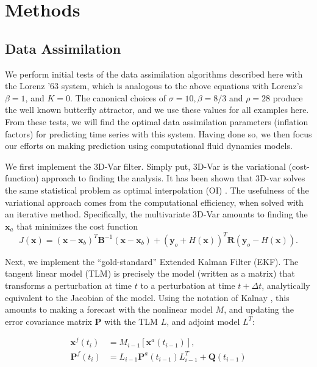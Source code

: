 \documentclass[10pt,letterpaper]{article}
\newcommand{\mbx}{\mathbf{x}}
\newcommand{\mby}{\mathbf{y}}
\newcommand{\mbB}{\mathbf{B}}
\newcommand{\mbR}{\mathbf{R}}
\newcommand{\mbP}{\mathbf{P}}
\begin{document}
\section*{Methods}

\subsection*{Data Assimilation}

We perform initial tests of the data assimilation algorithms described here with the Lorenz '63 system, which is analogous to the above equations with Lorenz's $\beta = 1$, and $K = 0$.
The canonical choices of $\sigma = 10, \beta = 8/3$ and $\rho = 28$ produce the well known butterfly attractor, and we use these values for all examples here.
From these tests, we will find the optimal data assimilation parameters (inflation factors) for predicting time series with this system.
Having done so, we then focus our efforts on making prediction using computational fluid dynamics models.

We first implement the 3D-Var filter.
Simply put, 3D-Var is the variational (cost-function) approach to finding the analysis.
It has been shown that 3D-var solves the same statistical problem as optimal interpolation (OI) \cite{lorenc1986analysis}.
The usefulness of the variational approach comes from the computational efficiency, when solved with an iterative method.
Specifically, the multivariate 3D-Var amounts to finding the $\mbx _a$ that minimizes the cost function
\begin{equation} J(\mbx) = (\mbx - \mbx_b) ^T \mbB ^{-1} (\mbx - \mbx_b) + (\mby_o + H(\mbx))^T\mbR (\mby_o - H(\mbx)) .\end{equation}

Next, we implement the ``gold-standard'' Extended Kalman Filter (EKF).
The tangent linear model (TLM) is precisely the model (written as a matrix) that transforms a perturbation at time $t$ to a perturbation at time $t+\Delta t$, analytically equivalent to the Jacobian of the model.
Using the notation of Kalnay \cite{kalnay2003}, this amounts to making a forecast with the nonlinear model $M$, and updating the error covariance matrix $\mbP$ with the TLM $L$, and adjoint model $L^T$:

\begin{align*} \mbx^f (t_i) &= M _{i-1} [\mbx ^a (t_{i-1} ) ],\\
\mbP^f (t_i ) &= L_{i-1} \mbP^a (t_{i-1} ) L^T _{i-1} + \mathbf{Q} (t_{i-1} ) \end{align*}
\end{document}

